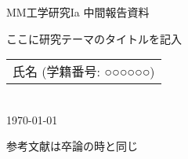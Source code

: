 \documentclass[12pt,oneside]{ise-thesis} %
\begin{document}
\begin{flushleft}
  MM工学研究Ia 中間報告資料
\end{flushleft}
\begin{center}
\vspace*{12pt}
{\Large ここに研究テーマのタイトルを記入}
\vspace{12pt} \\
\begin{tabular}{c}
氏名 (学籍番号: ○○○○○○)
\end{tabular} \vspace{3pt} \\
\today \vspace{12pt} \\
\end{center}










参考文献は卒論の時と同じ\cite{yan2018spatial}


\end{document}
